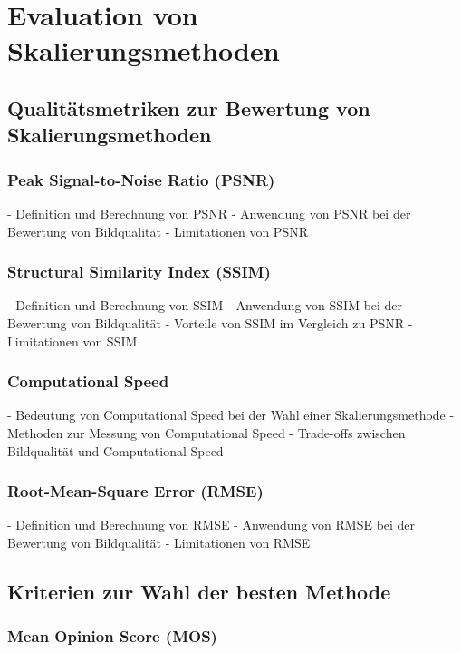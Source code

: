 


\chapter{Evaluation von Skalierungsmethoden}

\section{Qualitätsmetriken zur Bewertung von Skalierungsmethoden}

\subsection{Peak Signal-to-Noise Ratio (PSNR)}

- Definition und Berechnung von PSNR
- Anwendung von PSNR bei der Bewertung von Bildqualität
- Limitationen von PSNR

\subsection{Structural Similarity Index (SSIM)}

- Definition und Berechnung von SSIM
- Anwendung von SSIM bei der Bewertung von Bildqualität
- Vorteile von SSIM im Vergleich zu PSNR
- Limitationen von SSIM

\subsection{Computational Speed}

- Bedeutung von Computational Speed bei der Wahl einer Skalierungsmethode
- Methoden zur Messung von Computational Speed
- Trade-offs zwischen Bildqualität und Computational Speed

\subsection{Root-Mean-Square Error (RMSE)}

- Definition und Berechnung von RMSE
- Anwendung von RMSE bei der Bewertung von Bildqualität
- Limitationen von RMSE

\section{Kriterien zur Wahl der besten Methode}

\subsection{Mean Opinion Score (MOS)}

